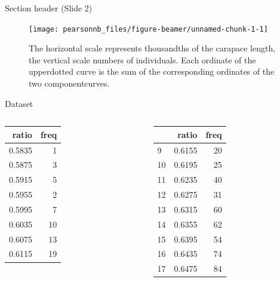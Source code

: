 \documentclass[
  ignorenonframetext,
]{beamer}
\begin{document}
\begin{frame}{}
\protect\hypertarget{section-1}{}
\end{frame}

\begin{frame}{Section header (Slide 2)}
\protect\hypertarget{section-header-slide-2-1}{}
\begin{figure}

\texttt{[image: pearsonnb\_files/figure-beamer/unnamed-chunk-1-1]} \hfill{}

\caption{The horizontal scale represents thousandths of the carapace length, the vertical scale numbers of individuals. Each ordinate of the upperdotted curve is the sum of the corresponding ordinates of the two componentcurves.}\label{fig:unnamed-chunk-1}
\end{figure}
\end{frame}

\begin{frame}{}
\protect\hypertarget{section-2}{}
\end{frame}

\begin{frame}{}
\protect\hypertarget{section-3}{}
\end{frame}

\begin{frame}{Dataset}
\protect\hypertarget{dataset}{}
\begin{columns}[T]
\begin{column}{0.48\textwidth}
\begin{longtable}[]{@{}rr@{}}
\toprule
ratio & freq \\
\midrule
\endhead
0.5835 & 1 \\
0.5875 & 3 \\
0.5915 & 5 \\
0.5955 & 2 \\
0.5995 & 7 \\
0.6035 & 10 \\
0.6075 & 13 \\
0.6115 & 19 \\
\bottomrule
\end{longtable}
\end{column}

\begin{column}{0.48\textwidth}
\begin{longtable}[]{@{}lrr@{}}
\toprule
& ratio & freq \\
\midrule
\endhead
9 & 0.6155 & 20 \\
10 & 0.6195 & 25 \\
11 & 0.6235 & 40 \\
12 & 0.6275 & 31 \\
13 & 0.6315 & 60 \\
14 & 0.6355 & 62 \\
15 & 0.6395 & 54 \\
16 & 0.6435 & 74 \\
17 & 0.6475 & 84 \\
\bottomrule
\end{longtable}
\end{column}
\end{columns}
\end{frame}
\end{document}
